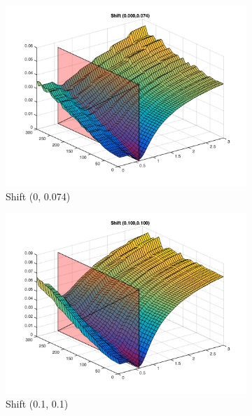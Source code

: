 \begin{figure}[!ht]
\begin{subfigure}{0.45\textwidth}
		\includegraphics[width=1\textwidth]{Results/ErrorByBlurAndNoiseForShift3}
		\caption{Shift (0, 0.074)}
	\end{subfigure}
	\begin{subfigure}{0.45\textwidth}
		\includegraphics[width=1\textwidth]{Results/ErrorByBlurAndNoiseForShift4}
		\caption{Shift (0.1, 0.1)}
	\end{subfigure}	
	\quad
	\begin{subfigure}{0.45\textwidth}

\end{subfigure}
\end{figure}
